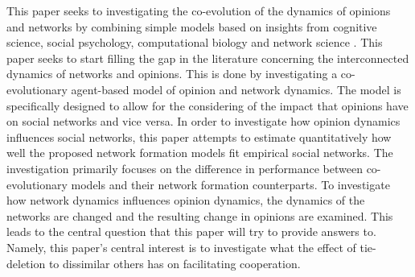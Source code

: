 \documentclass{article}
\begin{document}
\noindent This paper seeks to investigating the co-evolution of the dynamics of opinions and networks by combining simple models based on insights from cognitive science, social psychology, computational biology and network science \cite{asikainen_cumulative_2020,flache_models_2017,ilany_social_2016,jackson_meeting_2007,santos_cooperation_2006}. This paper seeks to start filling the gap in the literature concerning the interconnected dynamics of networks and opinions. This is done by investigating a co-evolutionary agent-based model of opinion and network dynamics. The model is specifically designed to allow for the considering of the impact that opinions have on social networks and vice versa. In order to investigate how opinion dynamics influences social networks, this paper attempts to estimate quantitatively how well the proposed network formation models fit empirical social networks. The investigation primarily focuses on the difference in performance between co-evolutionary models and their network formation counterparts. To investigate how network dynamics influences opinion dynamics, the dynamics of the networks are changed and the resulting change in opinions are examined. This leads to the central question that this paper will try to provide answers to. Namely, this paper’s central interest is to investigate what the effect of tie-deletion to dissimilar others has on facilitating cooperation. 
\end{document}

